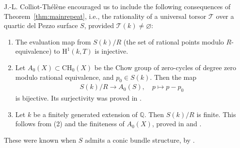 \documentclass[12pt, reqno]{amsart}
\theoremstyle{plain}
\theoremstyle{remark}
\theoremstyle{definition}
\numberwithin{equation}{section}
\def\cT{{\mathcal T}}
\def\bQ{{\mathbb Q}}
\def\rH{{\mathrm H}}
\begin{document}
J.-L. Colliot-Th\'el\`ene encouraged us to include the following consequences of Theorem~\ref{thm:mainrepeat}, i.e., the rationality of a universal torsor $\cT$ over a quartic del Pezzo surface $S$, provided $\cT(k)\neq \varnothing$:
\begin{enumerate}
    \item The evaluation map from $S(k)/R$ (the set of rational points modulo $R$-equivalence) to $\rH^1(k,T)$ is injective. 
 \item Let $A_{0}(X) \subset \mathrm{CH}_{0}(X)$ be the Chow group of zero-cycles of
degree zero modulo rational equivalence, and $p_0\in S(k)$.
  Then the map  
  \begin{align*}
      S(k)/R \to  A_{0}(S),\quad p\mapsto p-p_0
  \end{align*}
is bijective. 
Its surjectivity was proved in \cite{CTCoray}. 
\item Let $k$ be a finitely generated extension of $\bQ$. Then $S(k)/R$ is finite. This follows from (2) and the finiteness of $A_0(X)$, proved in \cite{CTchow} and \cite{Bloch}. 
\end{enumerate}
These were known when $S$ admits a conic bundle structure, by \cite{CTSkdP4R}.

	
	
	
\end{document}

